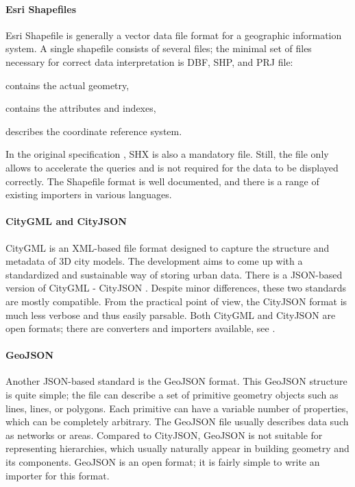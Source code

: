 \paragraph{Esri Shapefiles} 
Esri Shapefile \cite{esri1998shapefile} is generally a vector data file format for a geographic information system. A single shapefile consists of several files; the minimal set of files necessary for correct data interpretation is  DBF, SHP, and PRJ file: 

\begin{description}[noitemsep]
    \item[SHP] contains the actual geometry,
    \item[DBF] contains the attributes and indexes,
    \item[PRJ] describes the coordinate reference system.  
\end{description}
In the original specification \cite{esri1998shapefile}, SHX is also a mandatory file. Still, the file only allows to accelerate the queries and is not required for the data to be displayed correctly. The Shapefile format is well documented, and there is a range of existing importers in various languages. 


\paragraph{CityGML and CityJSON}
CityGML \cite{groger2012ogc} is an XML-based file format designed to capture the structure and metadata of 3D city models. The development aims to come up with a standardized and sustainable way of storing urban data. There is a JSON-based version of CityGML - CityJSON \cite{ledoux2019cityjson}. Despite minor differences, these two standards are mostly compatible. From the practical point of view, the CityJSON format is much less verbose and thus easily parsable. Both CityGML and CityJSON are open formats; there are converters and importers available, see \cite{cityJSONconvert, cityGMLimport}.

\paragraph{GeoJSON}
Another JSON-based standard is the GeoJSON format. This GeoJSON structure is quite simple; the file can describe a set of primitive geometry objects such as lines, lines, or polygons. Each primitive can have a variable number of properties, which can be completely arbitrary. The GeoJSON file usually describes data such as networks or areas. Compared to CityJSON, GeoJSON is not suitable for representing hierarchies, which usually naturally appear in building geometry and its components. GeoJSON is an open format; it is fairly simple to write an importer for this format. 


